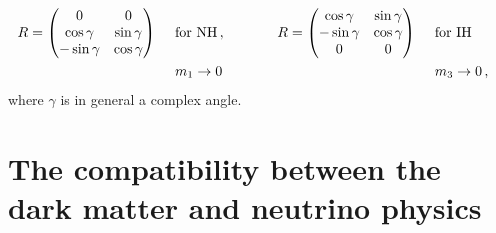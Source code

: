 \documentclass[12pt,letterpaper]{article}
\begin{document}
\begin{align}
\label{eq:R-matrix}
R=\begin{pmatrix}
0 & 0 \\
\cos\gamma & \sin\gamma \\
-\sin\gamma & \cos\gamma
\end{pmatrix}\hspace{0.5 cm} &\text{for NH}\,,&\hspace{1.0 cm}
R=\begin{pmatrix}
\cos\gamma & \sin\gamma \\
-\sin\gamma & \cos\gamma \\
0 & 0
\end{pmatrix}\hspace{0.5 cm} &\text{for IH}& \nonumber \\
&m_1 \rightarrow 0&   &m_3 \rightarrow 0\,,& 
\end{align}
%
where $\gamma$ is in general a complex angle.














\section{The compatibility between the dark matter and neutrino physics}
\label{sec:full-scan}
\end{document}
